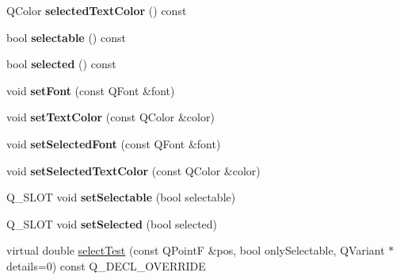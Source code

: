 \begin{DoxyCompactItemize}
\item 
Q\+Color {\bfseries selected\+Text\+Color} () const \hypertarget{class_q_c_p_abstract_legend_item_a076db1717257b82875b12a15ecf99ba3}{}\label{class_q_c_p_abstract_legend_item_a076db1717257b82875b12a15ecf99ba3}

\item 
bool {\bfseries selectable} () const \hypertarget{class_q_c_p_abstract_legend_item_a0a0205f33f37edae50826c24cb8f1983}{}\label{class_q_c_p_abstract_legend_item_a0a0205f33f37edae50826c24cb8f1983}

\item 
bool {\bfseries selected} () const \hypertarget{class_q_c_p_abstract_legend_item_ac776e68e3367704452131c6aa9908bb9}{}\label{class_q_c_p_abstract_legend_item_ac776e68e3367704452131c6aa9908bb9}

\item 
void {\bfseries set\+Font} (const Q\+Font \&font)\hypertarget{class_q_c_p_abstract_legend_item_a409c53455d8112f71d70c0c43eb10265}{}\label{class_q_c_p_abstract_legend_item_a409c53455d8112f71d70c0c43eb10265}

\item 
void {\bfseries set\+Text\+Color} (const Q\+Color \&color)\hypertarget{class_q_c_p_abstract_legend_item_a6ebace6aaffaedcdab2d74e88acc2d1e}{}\label{class_q_c_p_abstract_legend_item_a6ebace6aaffaedcdab2d74e88acc2d1e}

\item 
void {\bfseries set\+Selected\+Font} (const Q\+Font \&font)\hypertarget{class_q_c_p_abstract_legend_item_a91db5aee48617a9d3206e61376807365}{}\label{class_q_c_p_abstract_legend_item_a91db5aee48617a9d3206e61376807365}

\item 
void {\bfseries set\+Selected\+Text\+Color} (const Q\+Color \&color)\hypertarget{class_q_c_p_abstract_legend_item_a4d01d008ee1a5bfe9905b0397a421936}{}\label{class_q_c_p_abstract_legend_item_a4d01d008ee1a5bfe9905b0397a421936}

\item 
Q\+\_\+\+S\+L\+OT void {\bfseries set\+Selectable} (bool selectable)\hypertarget{class_q_c_p_abstract_legend_item_a8c85ab790bd201686b3b99380e31c4c3}{}\label{class_q_c_p_abstract_legend_item_a8c85ab790bd201686b3b99380e31c4c3}

\item 
Q\+\_\+\+S\+L\+OT void {\bfseries set\+Selected} (bool selected)\hypertarget{class_q_c_p_abstract_legend_item_adbfffe6ea3234fe78735d55af0287731}{}\label{class_q_c_p_abstract_legend_item_adbfffe6ea3234fe78735d55af0287731}

\item 
virtual double \hyperlink{class_q_c_p_abstract_legend_item_a8ca19faad8e2062e945772289a9151bd}{select\+Test} (const Q\+PointF \&pos, bool only\+Selectable, Q\+Variant $\ast$details=0) const Q\+\_\+\+D\+E\+C\+L\+\_\+\+O\+V\+E\+R\+R\+I\+DE
\end{DoxyCompactItemize}
